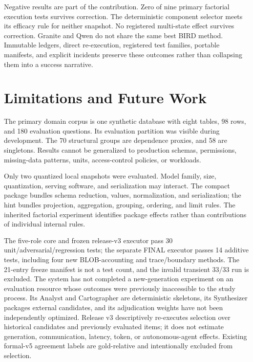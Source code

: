 \documentclass[applsci,article,submit,moreauthors]{Definitions/mdpi}
\begin{document}
Negative results are part of the contribution. Zero of nine primary factorial execution tests survives correction. The deterministic component selector meets its efficacy rule for neither snapshot. No registered multi-state effect survives correction. Granite and Qwen do not share the same best BIRD method. Immutable ledgers, direct re-execution, registered test families, portable manifests, and explicit incidents preserve these outcomes rather than collapsing them into a success narrative.

\section{Limitations and Future Work}

The primary domain corpus is one synthetic database with eight tables, 98 rows, and 180 evaluation questions. Its evaluation partition was visible during development. The 70 structural groups are dependence proxies, and 58 are singletons. Results cannot be generalized to production schemas, permissions, missing-data patterns, units, access-control policies, or workloads.

Only two quantized local snapshots were evaluated. Model family, size, quantization, serving software, and serialization may interact. The compact package bundles schema reduction, values, normalization, and serialization; the hint bundles projection, aggregation, grouping, ordering, and limit rules. The inherited factorial experiment identifies package effects rather than contributions of individual internal rules.

The five-role core and frozen release-v3 executor pass 30 unit/adversarial/regression tests; the separate FINAL executor passes 14 additive tests, including four new BLOB-accounting and trace/boundary methods. The 21-entry freeze manifest is not a test count, and the invalid transient 33/33 run is excluded. The system has not completed a new-generation experiment on an evaluation resource whose outcomes were previously inaccessible to the study process. Its Analyst and Cartographer are deterministic skeletons, its Synthesizer packages external candidates, and its adjudication weights have not been independently optimized. Release v3 descriptively re-executes selection over historical candidates and previously evaluated items; it does not estimate generation, communication, latency, token, or autonomous-agent effects. Existing formal-v5 agreement labels are gold-relative and intentionally excluded from selection.
\end{document}
